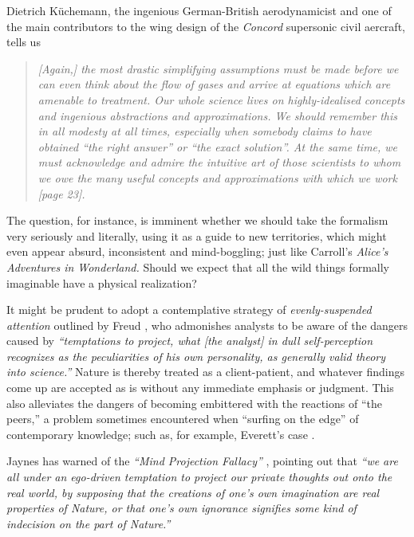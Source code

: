 Dietrich K\"uchemann,
the ingenious German-British aerodynamicist and
one of the main contributors to the wing design of the {\em Concord} supersonic civil aercraft, tells us
\cite{Kuchemann}
\begin{quote}
{\em
[Again,] the most drastic simplifying assumptions must be made before we can even think about
the flow of gases and arrive at equations which are amenable to treatment. Our whole
science lives on highly-idealised concepts and ingenious abstractions and approximations.
We should remember this in all modesty at all times, especially when somebody claims to
have obtained ``the right answer'' or ``the exact solution''.
At the same time, we must acknowledge and admire the intuitive art of those scientists
to whom we owe the many useful concepts and approximations with which we work [page 23].
}
\end{quote}



The question, for instance, is imminent whether we should take the formalism very seriously and literally,
using it as a guide to new territories, which might even appear absurd, inconsistent and mind-boggling;
just like Carroll's {\em Alice's Adventures in Wonderland.}
Should we expect that all the wild things formally imaginable have a physical realization?


It might be prudent to
adopt a contemplative strategy of {\em evenly-suspended attention}
outlined by  Freud \cite{Freud-1912}, who admonishes analysts to be aware of the dangers
caused by {\em ``temptations to project,
what  [the analyst]  in dull self-perception recognizes as the peculiarities of his own personality,
as generally valid theory into science.''}
Nature is thereby treated as a  client-patient,  and whatever findings come up are accepted  as is  without any
immediate emphasis or judgment.
This also alleviates the dangers of becoming embittered with the reactions of ``the peers,''
a problem sometimes encountered when ``surfing on the edge'' of contemporary knowledge; such as, for
example, Everett's case \cite{everett-collw}.

Jaynes has warned of the {\em ``Mind Projection Fallacy''} \cite{jaynes-89,jaynes-90}, pointing out that
{\em ``we are all under an ego-driven temptation to project our private
thoughts out onto the real world, by supposing that the creations of one's own imagination are real
properties of Nature, or that one's own ignorance signifies some kind of indecision on the part of
Nature.''}


